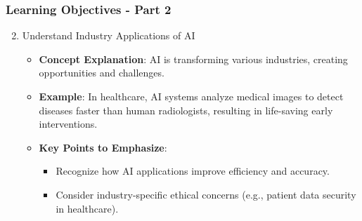 \documentclass[aspectratio=169]{beamer}
\begin{document}
\begin{frame}[fragile]
    \frametitle{Learning Objectives - Part 2}
    \begin{enumerate}
        \setcounter{enumi}{1} %
        \item Understand Industry Applications of AI
            \begin{itemize}
                \item \textbf{Concept Explanation}: AI is transforming various industries, creating opportunities and challenges.
                \item \textbf{Example}: In healthcare, AI systems analyze medical images to detect diseases faster than human radiologists, resulting in life-saving early interventions.
                \item \textbf{Key Points to Emphasize}: 
                    \begin{itemize}
                        \item Recognize how AI applications improve efficiency and accuracy.
                        \item Consider industry-specific ethical concerns (e.g., patient data security in healthcare).
                    \end{itemize}
            \end{itemize}
    \end{enumerate}
\end{frame}
\end{document}
